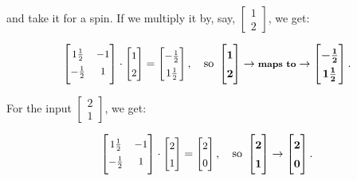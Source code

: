 \label{mmatrix}

and take it for a spin. If we multiply it by, say, {\footnotesize $\begin{bmatrix} 1
\\ 2 \end{bmatrix}$}, we get:

\begin{align*}
\renewcommand*{\arraystretch}{1.4}
\small
\begin{bmatrix}
1\frac{1}{2} & -1 \\
\smallskip
-\frac{1}{2} & 1 \\
\end{bmatrix} \cdot
\begin{bmatrix}
1 \\ 2 \\
\end{bmatrix} =
\begin{bmatrix}
-\frac{1}{2} \\ 1\frac{1}{2} \\
\end{bmatrix}, \normalsize \quad \textrm{so}\
\boldmath
\begin{bmatrix}
1 \\ 2 \\
\end{bmatrix} \rightarrow \textrm{\textbf{\footnotesize maps to}} \rightarrow
\begin{bmatrix}
-\frac{1}{2} \\ 1\frac{1}{2} \\
\end{bmatrix}.
\unboldmath
\end{align*}

For the input {\footnotesize $\begin{bmatrix} 2 \\ 1 \end{bmatrix}$}, we get:

\vspace{-.2in}
\begin{align*}
\renewcommand*{\arraystretch}{1.4}
\small
\begin{bmatrix}
1\frac{1}{2} & -1 \\
\smallskip
-\frac{1}{2} & 1 \\
\end{bmatrix} \cdot
\begin{bmatrix}
2 \\ 1 \\
\end{bmatrix} =
\begin{bmatrix}
2 \\ 0 \\
\end{bmatrix}, \normalsize \quad \textrm{so}\
\boldmath
\begin{bmatrix}
2 \\ 1 \\
\end{bmatrix} \rightarrow
\begin{bmatrix}
2 \\ 0 \\
\end{bmatrix}.
\unboldmath
\end{align*}

